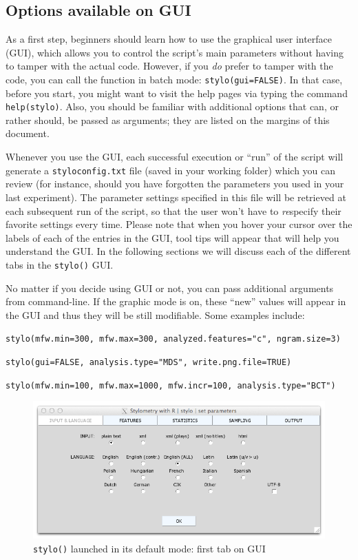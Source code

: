 \documentclass[11pt,a4paper]{article}
\def\underscore{\raisebox{-.8ex}{-}}
\def\code#1{{\tt #1}}
\begin{document}
\subsection{Options available on GUI}

As a first step, beginners should learn how to use the graphical user
interface (GUI), which allows you to control the script's main parameters
without having to tamper with the actual code. However, if you \emph{do} 
prefer to tamper with the code, you can call the function in batch mode:
\code{stylo(gui=FALSE)}. In that case, before you start, you might
want to visit the help pages via typing the command \code{help(stylo)}.
Also, you should be familiar with additional options that can, or
rather should, be passed as arguments; they are listed on the margins
of this document.

Whenever you use the GUI, each successful execution or ``run'' of the
script will generate a \code{stylo\underscore{}config.txt} file
(saved in your working folder) which you can review (for instance,
should you have forgotten the parameters you used in your last experiment).
The parameter settings specified in this file will be retrieved at
each subsequent run of the script, so that the user won't have to
\emph{re}specify their favorite settings every time. Please note that
when you hover your cursor over the labels of each of the entries
in the GUI, tool tips will appear that will help you understand the
GUI. In the following sections we will discuss each of the different
tabs in the \code{stylo()} GUI.

No matter if you decide using GUI or not, you can pass additional
arguments from command-line. If the graphic mode is on, these ``new''
values will appear in the GUI and thus they will be still modifiable.
Some examples include:

\medskip
\code{stylo(mfw.min=300, mfw.max=300, analyzed.features="c",
ngram.size=3)}

\medskip
\code{stylo(gui=FALSE, analysis.type="MDS",
write.png.file=TRUE)}

\medskip
\code{stylo(mfw.min=100, mfw.max=1000, mfw.incr=100, analysis.type="BCT")}

\medskip



\begin{figure}
  \centering
  \includegraphics[width=0.8\linewidth]{img/stylo-gui_tab1.png}
  \caption{\code{stylo()} launched in its default mode: first tab on GUI}
\end{figure}
\end{document}
